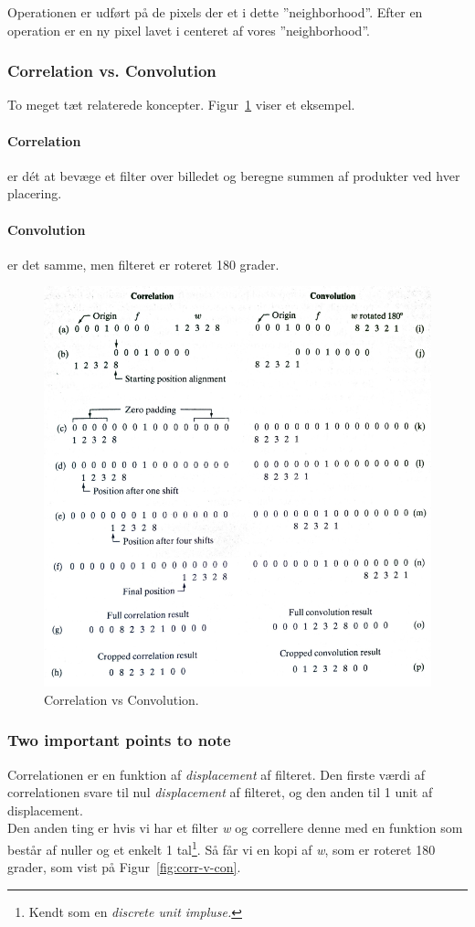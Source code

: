 Operationen er udført på de pixels der et i dette ''neighborhood''. Efter en operation er en ny pixel lavet i centeret af vores ''neighborhood''.

\subsubsection{Correlation vs. Convolution}
To meget tæt relaterede koncepter. Figur~\ref{fig:correlation-vs-convolution} viser et eksempel.

\paragraph{Correlation} er dét at bevæge et filter over billedet og beregne summen af produkter ved hver placering.

\paragraph{Convolution} er det samme, men filteret er roteret 180 grader.

\begin{figure}[H]
	\centering
	\includegraphics[width=0.9\linewidth]{figs/spm02/correlation-vs-convolution}
	\caption{Correlation vs Convolution.}
	\label{fig:correlation-vs-convolution}
\end{figure}

\subsubsection{Two important points to note}
Correlationen er en funktion af \textit{displacement} af filteret. Den firste værdi af correlationen svare til nul \textit{displacement} af filteret, og den anden til 1 unit af displacement.\\
Den anden ting er hvis vi har et filter \textit{w} og correllere denne med en funktion som består af nuller og et enkelt 1 tal\footnote{Kendt som en \textit{discrete unit impluse.}}. Så får vi en kopi af \textit{w}, som er roteret 180 grader, som vist på Figur~\ref{fig:corr-v-con}.

